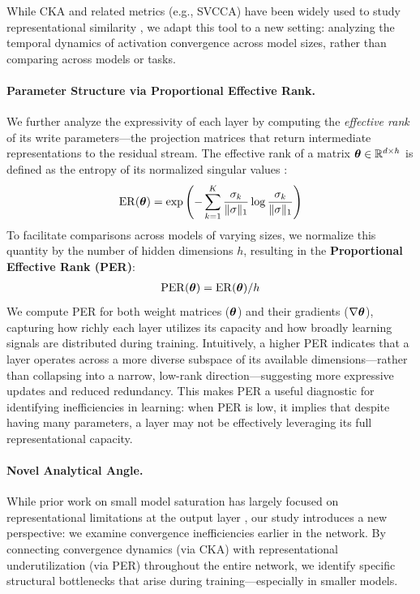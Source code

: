 While CKA and related metrics (e.g., SVCCA) have been widely used to study representational similarity \citep{wu2020similarity, phang2021finetuned, brown2023understanding}, we adapt this tool to a new setting: analyzing the temporal dynamics of activation convergence across model sizes, rather than comparing across models or tasks.

\paragraph{Parameter Structure via Proportional Effective Rank.}
We further analyze the expressivity of each layer by computing the \textit{effective rank} of its write parameters—the projection matrices that return intermediate representations to the residual stream. The effective rank of a matrix $\boldsymbol{\theta} \in \mathbb{R}^{d \times h}$ is defined as the entropy of its normalized singular values \citep{roy2007effectiverank}:
\begin{align}
    \mathrm{ER}(\boldsymbol{\theta}) = \exp\left(-\sum_{k=1}^K \frac{\sigma_k}{\|\sigma\|_1} \log \frac{\sigma_k}{\|\sigma\|_1}\right)
\end{align}
To facilitate comparisons across models of varying sizes, we normalize this quantity by the number of hidden dimensions $h$, resulting in the \textbf{Proportional Effective Rank (PER)}:
\begin{align}
    \mathrm{PER}(\boldsymbol{\theta}) = \mathrm{ER}(\boldsymbol{\theta}) / h
\end{align}
We compute PER for both weight matrices ($\boldsymbol{\theta}$) and their gradients ($\nabla \boldsymbol{\theta}$), capturing how richly each layer utilizes its capacity and how broadly learning signals are distributed during training. Intuitively, a higher PER indicates that a layer operates across a more diverse subspace of its available dimensions—rather than collapsing into a narrow, low-rank direction—suggesting more expressive updates and reduced redundancy. This makes PER a useful diagnostic for identifying inefficiencies in learning: when PER is low, it implies that despite having many parameters, a layer may not be effectively leveraging its full representational capacity.


\paragraph{Novel Analytical Angle.}
While prior work on small model saturation has largely focused on representational limitations at the output layer \citep{godey2024small, yang2018breaking}, our study introduces a new perspective: we examine convergence inefficiencies earlier in the network. By connecting convergence dynamics (via CKA) with representational underutilization (via PER) throughout the entire network, we identify specific structural bottlenecks that arise during training—especially in smaller models.

